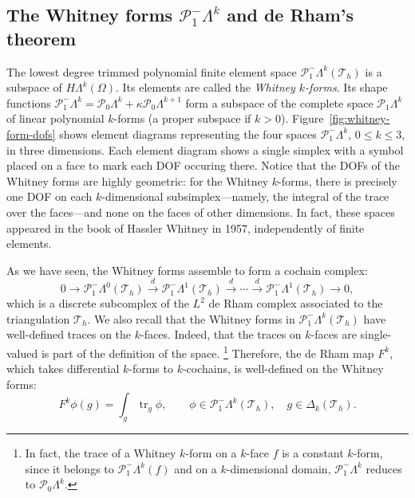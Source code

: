 \subsection{{The Whitney forms $\mathcal P_1^-\Lambda^k$ and de Rham's theorem}}\label{sec:whitney-forms-de-rham}

{The lowest degree trimmed polynomial finite element space $\mathcal P_1^-\Lambda^k(\mathcal T_h)$ is a subspace of $H\Lambda^k(\Omega)$. Its elements are called the \emph{Whitney $k$-forms}. Its shape functions $\mathcal P_1^-\Lambda^k=\mathcal P_0\Lambda^k+\kappa\mathcal P_0\Lambda^{k+1}$ form a subspace of the complete space $\mathcal P_1\Lambda^k$ of linear polynomial $k$-forms (a proper subspace if $k>0$). Figure~\ref{fig:whitney-form-dofs} shows element diagrams representing the four spaces $\mathcal P_1^-\Lambda^k$, $0\leq k\leq3$, in three dimensions. Each element diagram shows a single simplex with a symbol placed on a face to mark each DOF occuring there. Notice that the DOFs of the Whitney forms are highly geometric: for the Whitney $k$-forms, there is precisely one DOF on each $k$-dimensional subsimplex---namely, the integral of the trace over the faces---and none on the faces of other dimensions. In fact, these spaces appeared in the book  of Hassler Whitney in 1957, independently of finite elements.}

{As we have seen, the Whitney forms assemble to form a cochain complex:}
\begin{equation}\label{eq:whitney-form-complex}
0\to\mathcal P_1^-\Lambda^0(\mathcal T_h)\xrightarrow{d}\mathcal P_1^-\Lambda^1(\mathcal T_h)\xrightarrow{d}\cdots\xrightarrow{d}\mathcal P_1^-\Lambda^1(\mathcal T_h)\to0,
\end{equation}
{which is a discrete subcomplex of the $L^2$ de Rham complex associated to the triangulation $\mathcal T_h$. We also recall that the Whitney forms in $\mathcal P_1^-\Lambda^k(\mathcal T_h)$ have well-defined traces on the $k$-faces. Indeed, that the traces on $k$-faces are single-valued is part of the definition of the space.}
\footnote{{In fact, the trace of a Whitney $k$-form on a $k$-face $f$ is a constant $k$-form, since it belongs to $\mathcal P_1^-\Lambda^k(f)$ and on a $k$-dimensional domain, $\mathcal P_1^-\Lambda^k$ reduces to $\mathcal P_0\Lambda^k$.}}
{Therefore, the de Rham map $F^k$, which takes differential $k$-forms to $k$-cochains, is well-defined on the Whitney forms:}
\[
F^k\phi(g)=\int_g\operatorname{tr}_g\phi,\qquad\phi\in\mathcal P_1^-\Lambda^k(\mathcal T_h),\quad g\in\Delta_k(\mathcal T_h).
\]

